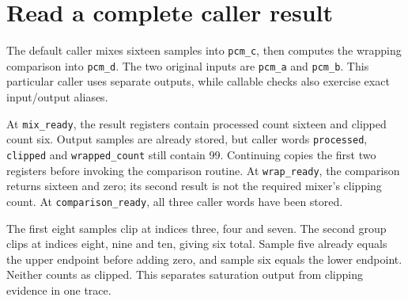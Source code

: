 \section{Read a complete caller result}\label{pcm-caller}
The default caller mixes sixteen samples into \texttt{pcm\_c}, then computes the
wrapping comparison into \texttt{pcm\_d}. The two original inputs are
\texttt{pcm\_a} and \texttt{pcm\_b}. This particular caller uses separate outputs,
while callable checks also exercise exact input/output aliases.

At \texttt{mix\_ready}, the result registers contain processed count sixteen and
clipped count six. Output samples are already stored, but caller words
\texttt{processed}, \texttt{clipped} and \texttt{wrapped\_count} still contain 99.
Continuing copies the first two registers before invoking the comparison routine.
At \texttt{wrap\_ready}, the comparison returns sixteen and zero; its second result
is not the required mixer's clipping count. At \texttt{comparison\_ready}, all
three caller words have been stored.

The first eight samples clip at indices three, four and seven. The second group
clips at indices eight, nine and ten, giving six total. Sample five already equals
the upper endpoint before adding zero, and sample six equals the lower endpoint.
Neither counts as clipped. This separates saturation output from clipping evidence
in one trace.
